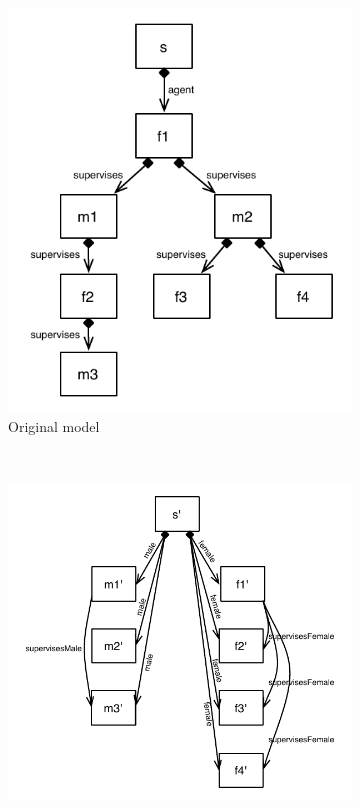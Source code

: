 \begin{figure}[htb]
        \centering
        \begin{subfigure}[b]{0.30\textwidth}
                \centering
                \includegraphics[width=1\textwidth]{./figures/policestation_dsltrans/model_police_hierarchy.pdf}
                \caption{Original model}
                \label{fig:police_hierarchy}
        \end{subfigure}%
        ~~
        \begin{subfigure}[b]{0.40\textwidth}
                \centering
                \includegraphics[width=1\textwidth]{./figures/policestation_dsltrans/model_police_gender.pdf}

\end{subfigure}
\end{figure}
